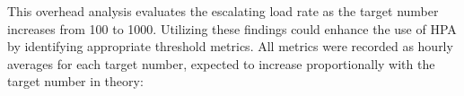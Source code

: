 This overhead analysis evaluates the escalating load rate as the target number increases from 100 to 1000. Utilizing these findings could enhance the use of \ac{HPA} by identifying appropriate threshold metrics. All metrics were recorded as hourly averages for each target number, expected to increase proportionally with the target number in theory: 

\begin{figure}[htpb]
  \centering
  \cpuA
  \cpuB
\end{figure}
